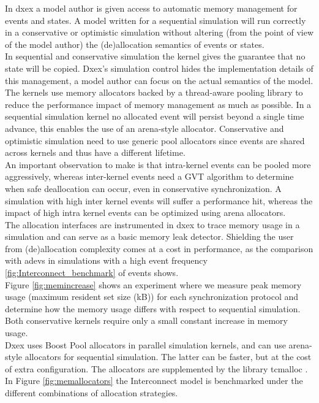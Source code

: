 In dxex a model author is given access to automatic memory management for events and states. A model written for a sequential simulation will run correctly in a conservative or optimistic simulation without altering (from the point of view of the model author) the (de)allocation semantics of events or states. \\
In sequential and conservative simulation the kernel gives the guarantee that no state will be copied. Dxex's simulation control hides the implementation details of this management, a model author can focus on the actual semantics of the model. 
The kernels use memory allocators backed by a thread-aware pooling library to reduce the performance impact of memory management as much as possible. 
In a sequential simulation kernel no allocated event will persist beyond a single time advance,  this enables the use of an arena-style allocator. Conservative and optimistic simulation need to use generic pool allocators since events are shared across kernels and thus have a different lifetime. \\
An important observation to make is that intra-kernel events can be pooled more aggressively, whereas inter-kernel events need a GVT algorithm to determine when safe deallocation can occur, even in conservative synchronization. A simulation with high inter kernel events will suffer a performance hit, whereas the impact of high intra kernel events can be optimized using arena allocators.\\
The allocation interfaces are instrumented in dxex to trace memory usage in a simulation and can serve as a basic memory leak detector. Shielding the user from (de)allocation complexity comes at a cost in performance, as the comparison with adevs in simulations with a high event frequency \ref{fig:Interconnect_benchmark} of events shows.\\
Figure \ref{fig:memincrease} shows an experiment where we measure peak memory usage (maximum resident set size (kB)) for each synchronization protocol and determine how the memory usage differs with respect to sequential simulation. Both conservative kernels require only a small constant increase in memory usage. 
\\
Dxex uses Boost Pool\cite{boostpool} allocators in parallel simulation kernels, and can use arena-style allocators for sequential simulation.
The latter can be faster, but at the cost of extra configuration. The allocators are supplemented by the library tcmalloc \cite{tcmalloc}. In Figure \ref{fig:memallocators} the Interconnect model is benchmarked under the different combinations of allocation strategies. \\
